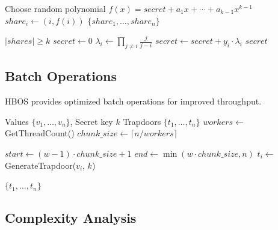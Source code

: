 \documentclass[../main_comprehensive.tex]{subfiles}
\begin{document}
\begin{algorithm}
\caption{$(k, n)$-Threshold Secret Sharing}
\label{alg:secret_sharing}
\begin{algorithmic}[1]
  \STATE Choose random polynomial $f(x) = secret + a_1x + \cdots + a_{k-1}x^{k-1}$
    \STATE $share_i \leftarrow (i, f(i))$
  \ENDFOR
  \RETURN $\{share_1, \ldots, share_n\}$
\ENDPROCEDURE

  \REQUIRE $|shares| \geq k$
  \STATE $secret \leftarrow 0$
    \STATE $\lambda_i \leftarrow \prod_{j \neq i} \frac{j}{j - i}$ 
    \STATE $secret \leftarrow secret + y_i \cdot \lambda_i$
  \ENDFOR
  \RETURN $secret$
\ENDPROCEDURE
\end{algorithmic}
\end{algorithm}

\subsection{Batch Operations}

HBOS provides optimized batch operations for improved throughput.

\begin{algorithm}
\caption{Batch Trapdoor Generation}
\label{alg:batch_trapdoor}
\begin{algorithmic}[1]
\REQUIRE Values $\{v_1, \ldots, v_n\}$, Secret key $k$
\ENSURE Trapdoors $\{t_1, \ldots, t_n\}$
\STATE $workers \leftarrow$ GetThreadCount()
\STATE $chunk\_size \leftarrow \lceil n / workers \rceil$

  \STATE $start \leftarrow (w-1) \cdot chunk\_size + 1$
  \STATE $end \leftarrow \min(w \cdot chunk\_size, n)$
    \STATE $t_i \leftarrow$ GenerateTrapdoor($v_i$, $k$)
  \ENDFOR
\ENDPARFOR

\RETURN $\{t_1, \ldots, t_n\}$
\end{algorithmic}
\end{algorithm}

\subsection{Complexity Analysis}
\end{document}

